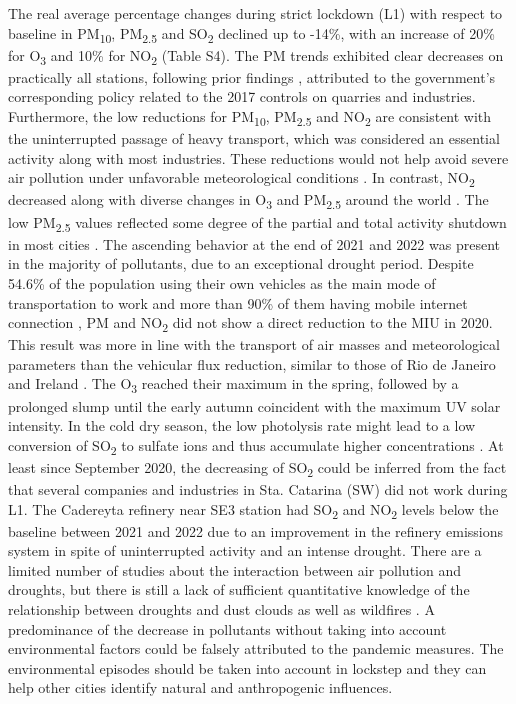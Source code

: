 \documentclass[sn-mathphys-num,iicol]{sn-jnl}
\begin{document}
The real average percentage changes during strict lockdown (L1) with respect to baseline in PM\textsubscript{10}, PM\textsubscript{2.5} and SO\textsubscript{2} declined up to -14\%, with an increase of 20\% for O\textsubscript{3} and 10\% for NO\textsubscript{2} (Table S4). The PM trends exhibited clear decreases on practically all stations, following prior findings \citep{Aguirre_L_pez_2022}, attributed to the government's corresponding policy related to the 2017 controls on quarries and industries. Furthermore, the low reductions for PM\textsubscript{10}, PM\textsubscript{2.5} and NO\textsubscript{2} are consistent with the uninterrupted passage of heavy transport, which was considered an essential activity along with most industries. These reductions would not help avoid severe air pollution under unfavorable meteorological conditions \citep{Wang_2020}. In contrast, NO\textsubscript{2} decreased along with diverse changes in O\textsubscript{3} and PM\textsubscript{2.5} around the world \citep{Sokhi2021}. The low PM\textsubscript{2.5} values reflected some degree of the partial and total activity shutdown in most cities \citep{Chauhan_2020,Saha_2022}. The ascending behavior at the end of 2021 and 2022 was present in the majority of pollutants, due to an exceptional drought period. Despite 54.6\% of the population using their own vehicles as the main mode of transportation to work \citep{mxico} and more than 90\% of them having mobile internet connection \citep{inegi2021b}, PM and NO\textsubscript{2} did not show a direct reduction to the MIU in 2020. This result was more in line with the transport of air masses and meteorological parameters than the vehicular flux reduction, similar to those of Rio de Janeiro \citep{Dantas_2020} and Ireland \citep{Spohn_2021}. The O\textsubscript{3} reached their maximum in the spring, followed by a prolonged slump until the early autumn coincident with the maximum UV solar intensity. In the cold dry season, the low photolysis rate might lead to a low conversion of SO\textsubscript{2} to sulfate ions and thus accumulate higher concentrations \citep{Gonz_lez_2018}. At least since September 2020, the decreasing of SO\textsubscript{2} could be inferred from the fact that several companies and industries in Sta. Catarina (SW) did not work during L1. The Cadereyta refinery near SE3 station had SO\textsubscript{2} and NO\textsubscript{2} levels below the baseline between 2021 and 2022 due to an improvement in the refinery emissions system in spite of uninterrupted activity and an intense drought. There are a limited number of studies about the interaction between air pollution and droughts, but there is still a lack of sufficient quantitative knowledge of the relationship between droughts and dust clouds as well as wildfires \citep{He_2024}. A predominance of the decrease in pollutants without taking into account environmental factors could be falsely attributed to the pandemic measures. The environmental episodes should be taken into account in lockstep \citep{Liu2020} and they can help other cities identify natural and anthropogenic influences.
\end{document}
